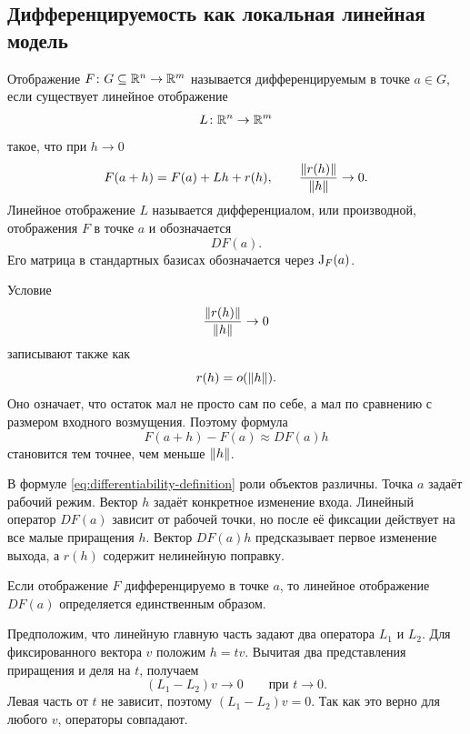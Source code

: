 \subsection{Дифференцируемость как локальная линейная модель}

\begin{definition}
Отображение \(F\colon G\subseteq\mathbb{R}^n\to\mathbb{R}^m\) называется дифференцируемым в точке \(a\in G\), если существует линейное отображение
\[
L\colon\mathbb{R}^n\to\mathbb{R}^m
\]
такое, что при \(h\to0\)
\begin{equation}
F(a+h)
=
F(a)+Lh+r(h),
\qquad
\frac{\lVert r(h)\rVert}{\lVert h\rVert}\to0.
\label{eq:differentiability-definition}
\end{equation}
Линейное отображение \(L\) называется дифференциалом, или производной, отображения \(F\) в точке \(a\) и обозначается
\[
DF(a).
\]
Его матрица в стандартных базисах обозначается через \(\mathrm{J}_{F}(a)\).
\end{definition}

Условие
\[
\frac{\lVert r(h)\rVert}{\lVert h\rVert}\to0
\]
записывают также как
\[
r(h)=o(\lVert h\rVert).
\]
Оно означает, что остаток мал не просто сам по себе, а мал по сравнению с размером входного возмущения. Поэтому формула
\begin{equation}
F(a+h)-F(a)
\approx
DF(a)h
\label{eq:linear-response}
\end{equation}
становится тем точнее, чем меньше \(\lVert h\rVert\).

В формуле \eqref{eq:differentiability-definition} роли объектов различны. Точка \(a\) задаёт рабочий режим. Вектор \(h\) задаёт конкретное изменение входа. Линейный оператор \(DF(a)\) зависит от рабочей точки, но после её фиксации действует на все малые приращения \(h\). Вектор \(DF(a)h\) предсказывает первое изменение выхода, а \(r(h)\) содержит нелинейную поправку.

\begin{theorem}
Если отображение \(F\) дифференцируемо в точке \(a\), то линейное отображение \(DF(a)\) определяется единственным образом.
\end{theorem}

\begin{proofidea}
Предположим, что линейную главную часть задают два оператора \(L_1\) и \(L_2\). Для фиксированного вектора \(v\) положим \(h=t v\). Вычитая два представления приращения и деля на \(t\), получаем
\[
(L_1-L_2)v\to0
\qquad
\text{при }t\to0.
\]
Левая часть от \(t\) не зависит, поэтому \((L_1-L_2)v=0\). Так как это верно для любого \(v\), операторы совпадают.
\end{proofidea}

